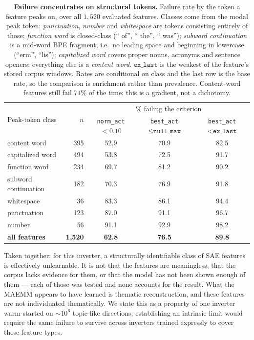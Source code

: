 \begin{table}[htbp]
\centering
\small
\begin{tabular}{lrccc}
\toprule
\multirow{2}{*}{Peak-token class} & \multirow{2}{*}{$n$} & \multicolumn{3}{c}{\% failing the criterion} \\
\cmidrule(lr){3-5}
 & & \shortstack{\texttt{norm\_act}\\[-1pt]$<0.10$}
   & \shortstack{\texttt{best\_act}\\[-1pt]$\leq\texttt{null\_max}$}
   & \shortstack{\texttt{best\_act}\\[-1pt]$<\texttt{ex\_last}$} \\
\midrule
content word         & 395 & 52.9 & 70.9 & 82.5 \\
capitalized word     & 494 & 53.8 & 72.5 & 91.7 \\
function word        & 234 & 69.7 & 81.2 & 90.2 \\
subword continuation & 182 & 70.3 & 76.9 & 91.8 \\
whitespace           &  36 & 83.3 & 86.1 & 94.4 \\
punctuation          & 123 & 87.0 & 91.1 & 96.7 \\
number               &  56 & 91.1 & 92.9 & 98.2 \\
\midrule
\textbf{all features} & \textbf{1{,}520} & \textbf{62.8} & \textbf{76.5} & \textbf{89.8} \\
\bottomrule
\end{tabular}
\caption{\textbf{Failure concentrates on structural tokens.} Failure rate by the token a feature
peaks on, over all $1{,}520$ evaluated features. Classes come from the modal peak token:
\emph{punctuation}, \emph{number} and \emph{whitespace} are tokens consisting entirely of those;
\emph{function word} is closed-class (`` of'', `` the'', `` was''); \emph{subword continuation} is a
mid-word BPE fragment, i.e.\ no leading space and beginning in lowercase (``erm'', ``lis'');
\emph{capitalized word} covers proper nouns, acronyms and sentence openers; everything else is a
\emph{content word}. $\texttt{ex\_last}$ is the weakest of the feature's stored corpus windows.
Rates are conditional on class and the last row is the
base rate, so the comparison is enrichment rather than prevalence. Content-word features still fail
$71\%$ of the time: this is a gradient, not a dichotomy.}
\label{tab:fail-by-token-class}
\end{table}

Taken together: for this inverter, a structurally identifiable class of SAE features is effectively
unlearnable. It is not that the features are meaningless, that the corpus lacks evidence for them, or
that the model has not been shown enough of them --- each of those was tested and none accounts for
the result. What the MAEMM appears to have learned is thematic reconstruction, and these features are
not individuated thematically. We state this as a property of one inverter warm-started on
${\sim}10^6$ topic-like directions; establishing an intrinsic limit would require the same failure to
survive across inverters trained expressly to cover these feature types.
